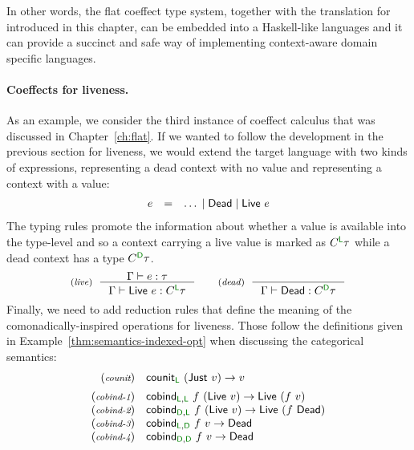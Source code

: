 In other words, the flat coeffect type system, together with the translation for introduced in this 
chapter, can be embedded into a Haskell-like languages and it can provide a succinct and safe way 
of implementing context-aware domain specific languages.

\paragraph{Coeffects for liveness.}
As an example, we consider the third instance of coeffect calculus that was discussed in 
Chapter~\ref{ch:flat}. If we wanted to follow the development in the previous section for liveness, 
we would extend the target language with two kinds of expressions,  representing a dead
context with no value and  representing a context with a value:
%
\begin{equation*}
\begin{array}{rcl}
e &=& \ldots \sep \ident{Dead} \sep \ident{Live}~e \\
\end{array}  
\end{equation*}
%
The typing rules promote the information about whether a value is available into the type-level 
and so a context carrying a live value is marked as $\ctyp{\cclrd{\ident{L}}}{\tau}$ while a
dead context has a type $\ctyp{\cclrd{\ident{D}}}{\tau}$.
%
\begin{equation*}
\tyrule{live}
  { \Gamma \vdash e:\tau }
  { \Gamma \vdash \ident{Live}~e : \ctyp{\cclrd{\ident{L}}}{\tau} }
\qquad
\tyrule{dead}
  { ~ }
  { \Gamma \vdash \ident{Dead} : \ctyp{\cclrd{\ident{D}}}{\tau} }
\end{equation*}
%
Finally, we need to add reduction rules that define the meaning of the comonadically-inspired
operations for liveness. Those follow the definitions given in Example~\ref{thm:semantics-indexed-opt}
when discussing the categorical semantics:
%
\begin{equation*}
\begin{array}{rl}
{\footnotesize(\emph{counit})} &
  \ident{counit}_{\cclrd{ \ident{L} }}~(\ident{Just}~v)   \rightarrow v
\\[0.5em]
{\footnotesize(\emph{cobind-1})} &
  \ident{cobind}_{\cclrd{\ident{L}}, \cclrd{\ident{L}}}~f~(\ident{Live}~v) \rightarrow \ident{Live}~(f~v)
\\
{\footnotesize(\emph{cobind-2})} &
  \ident{cobind}_{\cclrd{\ident{D}}, \cclrd{\ident{L}}}~f~(\ident{Live}~v) \rightarrow \ident{Live}~(f~\ident{Dead})
\\
{\footnotesize(\emph{cobind-3})} &
  \ident{cobind}_{\cclrd{\ident{L}}, \cclrd{\ident{D}}}~f~v \rightarrow \ident{Dead}
\\
{\footnotesize(\emph{cobind-4})} &
  \ident{cobind}_{\cclrd{\ident{D}}, \cclrd{\ident{D}}}~f~v \rightarrow \ident{Dead}
\end{array}
\end{equation*}
